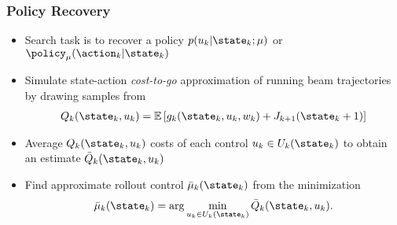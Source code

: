 \begin{frame}
	\frametitle{Policy Recovery}
	\begin{itemize}
		\item Search task is to recover a policy $p(u_k | \state_k; \mu)$ or $\policy_\mu(\action_k|\state_k)$
		\vspace{0.1in}
		\item Simulate state-action \textit{cost-to-go} approximation of running beam trajectories by drawing samples from
		\begin{align}
		Q_k(\state_k, u_k) = \mathbb{E}\left[g_k(\state_k, u_k, w_k) + J_{k+1}(\state_k+1)\right]
		\label{eq:q_est}
		\end{align}
		\item Average $Q_k(\state_k, u_k)$ costs of each control $u_k \in U_k(\state_k)$ to obtain an estimate $\bar{Q}_k(\state_k, u_k)$
		\vspace{0.1in}
		\item Find approximate rollout control $\bar{\mu}_k(\state_k)$ from the minimization 
		\begin{align}
		\bar{\mu}_k(\state_k) = \arg \min_{u_k \in U_k(\state_k)} \bar{Q}_k(\state_k, u_k).
		\end{align}
		
	\end{itemize}
\end{frame}

